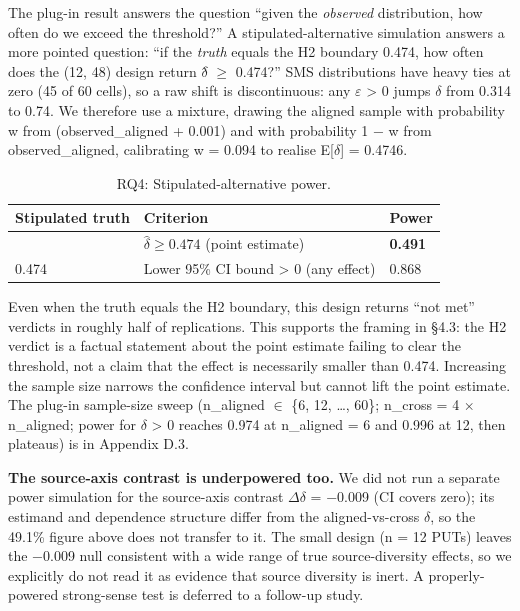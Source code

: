 \documentclass[review,12pt,authoryear]{elsarticle}
\begin{document}
The plug-in result answers the question ``given the \emph{observed}
distribution, how often do we exceed the threshold?'' A
stipulated-alternative simulation answers a more pointed question: ``if
the \emph{truth} equals the H2 boundary 0.474, how often does the (12,
48) design return $\delta$̂ $\geq$ 0.474?'' SMS distributions have heavy ties at zero
(45 of 60 cells), so a raw shift is discontinuous: any $\varepsilon$ \textgreater{}
0 jumps $\delta$ from 0.314 to 0.74. We therefore use a mixture, drawing the
aligned sample with probability w from (observed\_aligned + 0.001) and
with probability 1 − w from observed\_aligned, calibrating w = 0.094 to
realise E{[}$\delta${]} = 0.4746.

{\def\LTcaptype{table} %
\begin{longtable}[]{@{}lll@{}}
\caption{RQ4: Stipulated-alternative power.}\label{tab:p2-11}\\
\toprule\noalign{}
Stipulated truth & Criterion & Power \\
\midrule\noalign{}
\endfirsthead
\endhead
\bottomrule\noalign{}
\endlastfoot
0.474 & $\hat{\delta} \geq 0.474$ (point estimate) & \textbf{0.491} \\
0.474 & Lower 95\% CI bound \textgreater{} 0 (any effect) & 0.868 \\
\end{longtable}
}

Even when the truth equals the H2 boundary, this design returns ``not
met'' verdicts in roughly half of replications. This supports the
framing in §4.3: the H2 verdict is a factual statement about the point
estimate failing to clear the threshold, not a claim that the effect is
necessarily smaller than 0.474. Increasing the sample size narrows the
confidence interval but cannot lift the point estimate. The plug-in
sample-size sweep (n\_aligned $\in$ \{6, 12, \ldots, 60\}; n\_cross = 4 $\times$
n\_aligned; power for $\delta$ \textgreater{} 0 reaches 0.974 at n\_aligned = 6
and 0.996 at 12, then plateaus) is in Appendix D.3.

\textbf{The source-axis contrast is underpowered too.} We did not run a
separate power simulation for the source-axis contrast $\Delta\delta$ =
−0.009 (CI covers zero); its estimand and dependence structure differ
from the aligned-vs-cross $\delta$, so the 49.1\% figure above does not
transfer to it. The small design (n = 12 PUTs) leaves the −0.009 null
consistent with a wide range of true source-diversity effects, so we
explicitly do not read it as evidence that source diversity is inert. A
properly-powered strong-sense test is deferred to a follow-up study.
\end{document}
